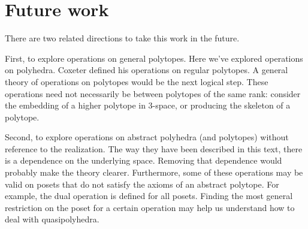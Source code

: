 \documentclass{article}
\begin{document}
\section{Future work}
There are two related directions to take this work in the future.

First, to explore operations on general polytopes. Here we've explored
operations on polyhedra. Coxeter defined his operations on regular polytopes.
A general theory of operations on polytopes would be the next logical step.
These operations need not necessarily be between polytopes of the same rank:
consider the embedding of a higher polytope in 3-space, or producing the
skeleton of a polytope.

Second, to explore operations on abstract polyhedra (and polytopes) without
reference to the realization. The way they have been described in this text,
there is a dependence on the underlying space. Removing that dependence would
probably make the theory clearer. Furthermore, some of these operations may be
valid on posets that do not satisfy the axioms of an abstract polytope. For
example, the dual operation is defined for all posets. Finding the most general
restriction on the poset for a certain operation may help us understand how to
deal with quasipolyhedra.
\end{document}
